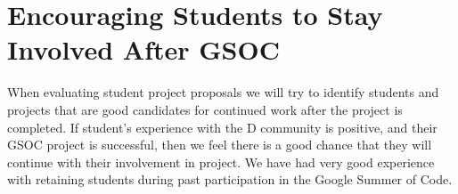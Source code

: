 \documentclass[	DIV=calc,%
							paper=a4,%
							fontsize=11pt,%
							twocolumn]{scrartcl}	 					%
\begin{document}
\section{Encouraging Students to Stay Involved After GSOC}


When evaluating student project proposals we will try to identify
students and projects that are good candidates for continued work
after the project is completed.  If student's experience with the 
D community is positive, and their GSOC project is successful, then
we feel there is a good chance that they will continue with their
involvement in project. We have had very good experience with retaining
students during past participation in the Google Summer of Code.     
\end{document}
